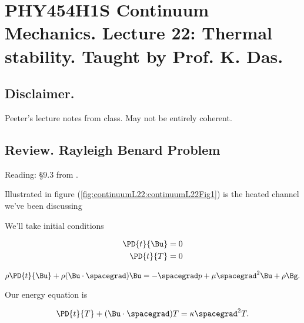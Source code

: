 
%

\chapter{PHY454H1S Continuum Mechanics.  Lecture 22: Thermal stability.  Taught by Prof. K. Das.}
\label{chap:continuumL22}
{}
\date{Apr 4, 2012}

\beginArtWithToc

\section{Disclaimer.}

Peeter's lecture notes from class.  May not be entirely coherent.

\section{Review.  Rayleigh Benard Problem}

Reading: \S 9.3 from \cite{acheson1990elementary}.

Illustrated in figure (\ref{fig:continuumL22:continuumL22Fig1}) is the heated channel we've been discussing


We'll take initial conditions

\begin{align}\label{eqn:continuumL22:10}
\PD{t}{\Bu} &= 0 \\
\PD{t}{T} &= 0
\end{align}

\begin{equation}\label{eqn:continuumL22:30}
\rho \PD{t}{\Bu} + \rho (\Bu \cdot \spacegrad) \Bu = - \spacegrad p + \mu \spacegrad^2 \Bu + \rho \Bg.
\end{equation}

Our energy equation is

\begin{equation}\label{eqn:continuumL22:50}
\PD{t}{T} + (\Bu \cdot \spacegrad) T = \kappa \spacegrad^2 T.
\end{equation}

